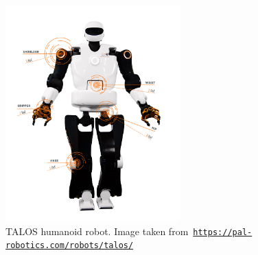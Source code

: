\begin{figure}[t]
\centering
    \includegraphics[width=0.6\textwidth]{chapter_introduction/figures/TALOS_FRONT.jpg}
    \caption[TALOS humanoid robot]{TALOS humanoid robot. Image taken from~\href{https://pal-robotics.com/robots/talos/}{\texttt{https://pal-robotics.com/robots/talos/}}
    \label{fig:talos}}
\end{figure}

